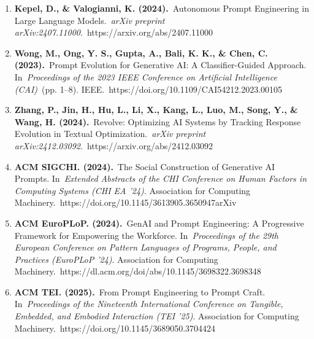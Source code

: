 \documentclass[10pt,a4paper,twocolumn]{article}
\begin{document}
\begin{enumerate}
  \item 
\textbf{Kepel, D., \& Valogianni, K. (2024).} Autonomous Prompt Engineering in Large Language Models. \textit{arXiv preprint arXiv:2407.11000}. https://arxiv.org/abs/2407.11000

   \item 
\textbf{Wong, M., Ong, Y. S., Gupta, A., Bali, K. K., \& Chen, C. (2023).} Prompt Evolution for Generative AI: A Classifier-Guided Approach. In \textit{Proceedings of the 2023 IEEE Conference on Artificial Intelligence (CAI)} (pp. 1–8). IEEE. https://doi.org/10.1109/CAI54212.2023.00105

  \item 
\textbf{Zhang, P., Jin, H., Hu, L., Li, X., Kang, L., Luo, M., Song, Y., \& Wang, H. (2024).} Revolve: Optimizing AI Systems by Tracking Response Evolution in Textual Optimization. \textit{arXiv preprint arXiv:2412.03092}. https://arxiv.org/abs/2412.03092

   \item 
\textbf{ACM SIGCHI. (2024).} The Social Construction of Generative AI Prompts. In \textit{Extended Abstracts of the CHI Conference on Human Factors in Computing Systems (CHI EA '24)}. Association for Computing Machinery. https://doi.org/10.1145/3613905.3650947arXiv

  \item 
\textbf{ACM EuroPLoP. (2024).} GenAI and Prompt Engineering: A Progressive Framework for Empowering the Workforce. In \textit{Proceedings of the 29th European Conference on Pattern Languages of Programs, People, and Practices (EuroPLoP '24)}. Association for Computing Machinery. https://dl.acm.org/doi/abs/10.1145/3698322.3698348

  \item 
\textbf{ACM TEI. (2025).} From Prompt Engineering to Prompt Craft. In \textit{Proceedings of the Nineteenth International Conference on Tangible, Embedded, and Embodied Interaction (TEI '25)}. Association for Computing Machinery. https://doi.org/10.1145/3689050.3704424



 

\end{enumerate}
\end{document}
